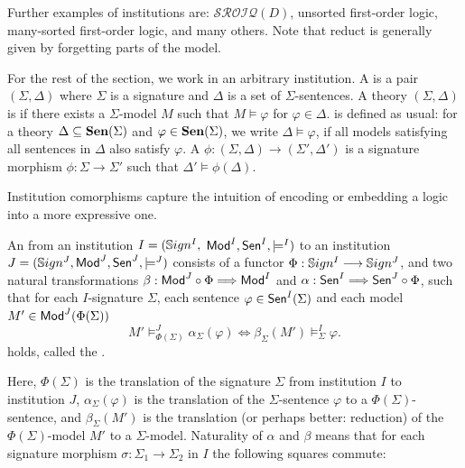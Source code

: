 \documentclass[10pt,fleqn,%
\ifpretendfinal
final%
\else
draft%
\fi,
]{scrreprt}
\begin{document}
Further examples of institutions are: $\mathcal{SROIQ}(D)$, unsorted first-order logic, 
many-sorted first-order logic, and many others.  Note that reduct is generally given by forgetting 
parts of the model.

For the rest of the section, we work in an arbitrary institution. 
A  is a pair $(\Sigma,\Delta)$ where $\Sigma$ is a signature and $\Delta$ is a set of $\Sigma$-sentences.
 A theory $(\Sigma, \Delta)$ is  if there exists a $\Sigma$-model $M$ such that
$M\models\varphi$ for $\varphi \in \Delta$.  is defined as usual: 
for  a theory $\Delta\subseteq \mathbf {Sen}(\Sigma)$ and 
$\varphi\in \mathbf {Sen}(\Sigma)$, we write $\Delta\models\varphi$, if all models satisfying all sentences in
$\Delta$ also satisfy $\varphi$. A  $\phi: (\Sigma, \Delta) \rightarrow (\Sigma',  \Delta')$ is 
   a signature morphism $\phi:\Sigma\rightarrow \Sigma'$ such that $\Delta'\models \phi(\Delta)$.

\medskip

Institution comorphisms capture the intuition of encoding or embedding a logic into a more expressive one.

\begin{definition} An  from an institution $I = (\mathbb{S}ign^I,$ $ \mathsf{Mod}^I, \mathsf{Sen}^I, \models^I)$ to an institution $J=(\mathbb{S}ign^J, \mathsf{Mod}^J,\mathsf{Sen}^J, \models^J)$ consists of a functor $\Phi : \mathbb{S}ign^I \longrightarrow \mathbb{S}ign^J$, and
two natural transformations $\beta: \mathsf{Mod}^J \circ \Phi \Longrightarrow \mathsf{Mod}^I$
and $\alpha: \mathsf{Sen}^I \Longrightarrow \mathsf{Sen}^J \circ \Phi$, such that 
for each $I$-signature $\Sigma$, each sentence $\varphi\in\mathsf{Sen}^I(\Sigma)$ and each model $M'\in\mathsf{Mod}^J(\Phi(\Sigma))$
$$ M'\models^{J}_{\Phi(\Sigma)}\alpha_{\Sigma}(\varphi) \Leftrightarrow
\beta_{\Sigma}(M')\models^I_{\Sigma}\varphi.
$$
holds, called the .
\end{definition}

\noindent
Here, $\Phi(\Sigma)$ is the translation of the signature $\Sigma$ from
institution $I$ to institution $J$, $\alpha_{\Sigma}(\varphi)$ is the
translation of the $\Sigma$-sentence $\varphi$ to a
$\Phi(\Sigma)$-sentence, and $\beta_{\Sigma}(M')$ is the translation
(or perhaps better: reduction) of the $\Phi(\Sigma)$-model $M'$ to a
$\Sigma$-model. Naturality of $\alpha$ and $\beta$ means that for each
signature morphism $\sigma:\Sigma_1\rightarrow\Sigma_2$ in $I$ the following 
squares commute:
\end{document}
